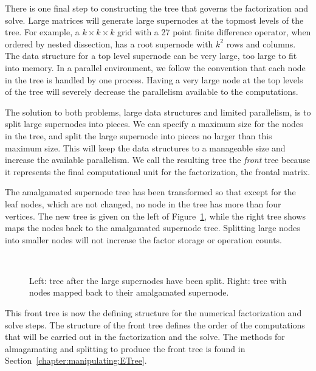 \par
There is one final step to constructing the tree that governs the
factorization and solve.
Large matrices will generate large supernodes at the topmost levels
of the tree.
For example, a $k \times k \times k$ grid with a 27 point finite
difference operator, when ordered by nested dissection, has a root
supernode with $k^2$ rows and columns.
The data structure for a top level supernode can be very large,
too large to fit into memory.
In a parallel environment, we follow the convention that each node
in the tree is handled by one process.
Having a very large node at the top levels of the tree will
severely decrease the parallelism available to the computations.
\par
The solution to both problems, large data structures and limited
parallelism, is to split large supernodes into pieces.
We can specify a maximum size for the nodes in the tree, and split
the large supernode into pieces no larger than this maximum size.
This will keep the data structures to a manageable size and increase
the available parallelism.  We call the resulting tree the {\it front}
tree because it represents the final computational unit for the
factorization, the frontal matrix.
\par
The amalgamated supernode tree has been transformed so that except for
the leaf nodes, which are not changed, no node in the tree has more 
than four vertices.
The new tree is given on the left
of Figure~\ref{fig:R2D100-tree-split},
while the right tree shows maps the nodes back to the amalgamated
supernode tree.
Splitting large nodes into smaller nodes will not increase the
factor storage or operation counts.
\par
\begin{figure}[htbp]
\caption{Left: tree after the large supernodes have been split.
Right: tree with nodes mapped back to their amalgamated supernode.}
\label{fig:R2D100-tree-split}
\begin{center}
\mbox{
}
\quad
\mbox{
}
\end{center}
\end{figure}
\par
This front tree is now the defining
structure for the numerical factorization and solve steps.  The structure
of the front tree defines the order of the computations that will be
carried out in the factorization and the solve.  The methods for
almagamating and splitting to produce the front tree is found in
Section~\ref{chapter:manipulating:ETree}.
\par
